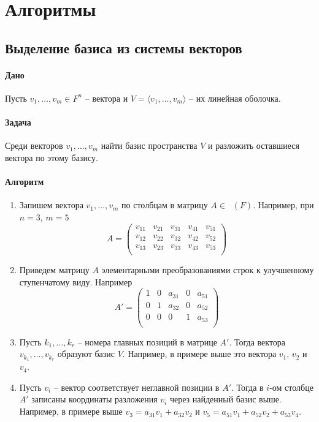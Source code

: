\documentclass{article}
\newcommand{\MatrixDim}[3]{\mathop{\mathrm{M}_{#2\,#3}}(#1)}
\begin{document}
\section*{Алгоритмы}

\subsection{Выделение базиса из системы векторов}

\paragraph{Дано}

Пусть $v_1,\ldots,v_m\in F^n$ -- вектора и $V = \langle v_1,\ldots,v_m\rangle$ -- их линейная оболочка. 

\paragraph{Задача}

Среди векторов $v_1,\ldots,v_m$ найти базис пространства $V$ и разложить оставшиеся вектора по этому базису.

\paragraph{Алгоритм}

\begin{enumerate}
\item Запишем вектора $v_1,\ldots,v_m$ по столбцам в матрицу $A \in \MatrixDim{F}{n}{m}$. Например, при $n = 3$, $m = 5$
\[
A = 
\begin{pmatrix}
{v_{11}}&{v_{21}}&{v_{31}}&{v_{41}}&{v_{51}}\\
{v_{12}}&{v_{22}}&{v_{32}}&{v_{42}}&{v_{52}}\\
{v_{13}}&{v_{23}}&{v_{33}}&{v_{43}}&{v_{53}}\\
\end{pmatrix}
\]
\item Приведем матрицу $A$ элементарными преобразованиями строк к улучшенному ступенчатому виду. Например
\[
A' = 
\begin{pmatrix}
{1}&{0}&{a_{31}}&{0}&{a_{51}}\\
{0}&{1}&{a_{32}}&{0}&{a_{52}}\\
{0}&{0}&{0}&{1}&{a_{53}}\\
\end{pmatrix}
\]
\item Пусть $k_1,\ldots,k_r$ -- номера главных позиций в матрице $A'$. Тогда вектора $v_{k_1},\ldots,v_{k_r}$ образуют базис $V$. Например, в примере выше это вектора $v_1$, $v_2$ и $v_4$.

\item Пусть $v_i$ -- вектор соответствует неглавной позиции в $A'$. Тогда в $i$-ом столбце $A'$ записаны координаты разложения $v_i$ через найденный базис выше. Например, в примере выше $v_3 = a_{31}v_1 + a_{32}v_2$ и $v_5 = a_{51}v_1 + a_{52}v_2 + a_{53}v_4$.
\end{enumerate}
\end{document}
